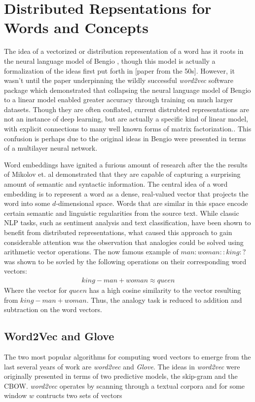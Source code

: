 \documentclass{ws-procs11x85}
\begin{document}
\section{Distributed Repsentations for Words and Concepts}\label{aba:intro}
The idea of a vectorized or distribution representation of a word has it roots in the neural language model of Bengio \cite{bengio2003neural}, though this model is actually a formalization of the ideas first put forth in [paper from the 50s]. However, it wasn't until the paper\cite{mikolov2013distributed} underpinning the wildly successful \emph{word2vec} software package which demonstrated that collapsing the neural language model of Bengio\cite{bengio2003neural} to a linear model enabled greater accuracy through training on much larger datasets. Though they are often conflated, current distrubted representations are not an instance of deep learning, but are actually a specific kind of linear model, with explicit connections to many well known forms of matrix factorization.\cite{levy2014neural}. This confusion is perhaps due to the original ideas in Bengio\cite{bengio2003neural} were presented in terms of a multilayer neural network.

Word embeddings have ignited a furious amount of research after the the results of Mikolov\cite{mikolov2013distributed} et. al demonstrated that they are capable of capturing a surprising amount of semantic  and syntactic information. The central idea of a word embedding is to represent a word as a dense, real-valued vector that projects the word into some $d$-dimensional space. Words that are similar in this space encode certain semantic and linguistic regularities from the source text. While classic NLP tasks, such as sentiment analysis and text classification, have been shown to benefit from distributed representations, what caused this approach to gain considerable attention was the observation that analogies could be solved using arithmetic vector operations. The now famous example of $man:woman::king:?$ was shown to be sovled by the following operations on their corresponding word vectors: 
\begin{align*}
king - man + woman \approx queen
\end{align*}
Where the vector for $queen$ has a high cosine similarity to the vector resulting from $king - man + woman$. Thus, the analogy task is reduced to addition and subtraction on the word vectors.

 \subsection{Word2Vec and Glove}
The two most popular algorithms for computing word vectors to emerge from the last several years of work are \emph{word2vec}\cite{mikolov2013distributed} and \emph{Glove}\cite{pennington2014glove}. The ideas in \emph{word2vec} were originally presented in terms of two predictive models, the skip-gram and the CBOW. \emph{word2vec} operates by scanning through a textual corpora and for some window $w$ contructs two sets of vectors 
\end{document}
